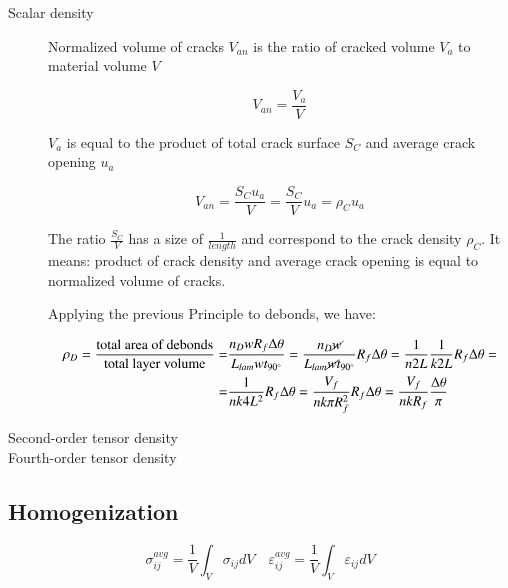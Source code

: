\documentclass[review]{elsarticle}
\begin{document}
\begin{description}
\item[Scalar density] Normalized volume of cracks $V_{an}$ is the ratio of cracked volume $V_{a}$ to material volume $V$

\begin{equation}
V_{an}=\frac{V_{a}}{V}
\end{equation}

$V_{a}$ is equal to the product of total crack surface $S_{C}$ and average crack opening $u_{a}$

\begin{equation}
V_{an}=\frac{S_{C}u_{a}}{V}=\frac{S_{C}}{V}u_{a}=\rho_{C}u_{a}
\end{equation}

The ratio $\frac{S_{C}}{V}$ has a size of $\frac{1}{length}$ and correspond to the crack density $\rho_{C}$. It means: product of crack density and average crack opening is equal to normalized volume of cracks.

Applying the previous Principle to debonds, we have:

\begin{equation}
\begin{aligned}
\rho_{D}=\frac{\text{total area of debonds}}{\text{total layer volume}}=&\frac{n_{D}wR_{f}\Delta\theta}{L_{lam}wt_{90^{\circ}}}=\frac{n_{D}\cancel{w}}{L_{lam}\cancel{w}t_{90^{\circ}}}R_{f}\Delta\theta=\frac{1}{n2L}\frac{1}{k2L}R_{f}\Delta\theta=\\=&\frac{1}{nk4L^{2}}R_{f}\Delta\theta=\frac{V_{f}}{nk\pi R_{f}^{2}}R_{f}\Delta\theta=\frac{V_{f}}{nkR_{f}}\frac{\Delta\theta}{\pi}
\end{aligned}
\end{equation}

\item[Second-order tensor density]

\item[Fourth-order tensor density]

\end{description}

\subsection{Homogenization}

\begin{equation}
\sigma_{ij}^{avg}=\frac{1}{V}\int_{V}\sigma_{ij}dV\quad\varepsilon_{ij}^{avg}=\frac{1}{V}\int_{V}\varepsilon_{ij}dV
\end{equation}
\end{document}
